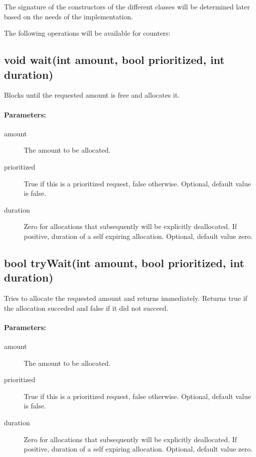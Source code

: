 \documentclass[a4paper,11pt]{article}
\begin{document}
The signature of the constructors of the different classes will be
determined later based on the needs of the implementation.

The following operations will be available for counters:

\subsection{void wait(int amount, bool prioritized, int duration)}

Blocks until the requested amount is free and allocates it.

\paragraph{Parameters:}
\begin{description}
\item[amount] The amount to be allocated.
\item[prioritized] True if this is a prioritized request, false
  otherwise. Optional, default value is false.
\item[duration] Zero for allocations that subsequently will be
  explicitly deallocated. If positive, duration of a self expiring
  allocation. Optional, default value zero.
\end{description}

\subsection{bool tryWait(int amount, bool prioritized, int duration)}

Tries to allocate the requested amount and returns immediately.
Returns true if the allocation succeded and false if it did not
succeed.

\paragraph{Parameters:}
\begin{description}
\item[amount] The amount to be allocated.
\item[prioritized] True if this is a prioritized request, false
  otherwise. Optional, default value is false.
\item[duration] Zero for allocations that subsequently will be
  explicitly deallocated. If positive, duration of a self expiring
  allocation. Optional, default value zero.
\end{description}
\end{document}
